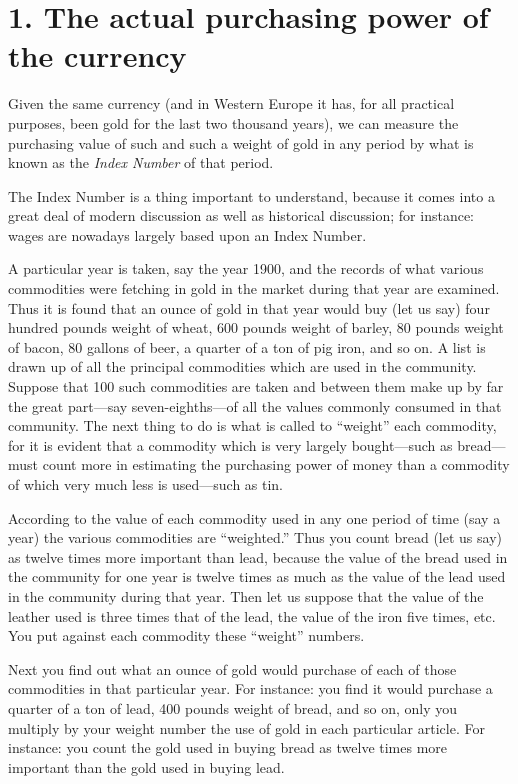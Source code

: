 \documentclass{book}
\begin{document}
\section*{1. The actual purchasing power of the currency}
Given the same currency (and in Western Europe it has, for all practical purposes, been gold for the last two thousand years), we can measure the purchasing value of such and such a weight of gold in any period by what is known as the \emph{Index Number} of that period.

The Index Number is a thing important to understand, because it comes into a great deal of modern discussion as well as historical discussion; for instance: wages are nowadays largely based upon an Index Number.

A particular year is taken, say the year 1900, and the records of what various commodities were fetching in gold in the market during that year are examined. Thus it is found that an ounce of gold in that year would buy (let us say) four hundred pounds weight of wheat, 600 pounds weight of barley, 80 pounds weight of bacon, 80 gallons of beer, a quarter of a ton of pig iron, and so on. A list is drawn up of all the principal commodities which are used in the community. Suppose that 100 such commodities are taken and between them make up by far the great part—say seven-eighths—of all the values commonly consumed in that community. The next thing to do is what is called to “weight” each commodity, for it is evident that a commodity which is very largely bought—such as bread—must count more in estimating the purchasing power of money than a commodity of which very much less is used—such as tin.

According to the value of each commodity used in any one period of time (say a year) the various commodities are “weighted.” Thus you count bread (let us say) as twelve times more important than lead, because the value of the bread used in the community for one year is twelve times as much as the value of the lead used in the community during that year. Then let us suppose that the value of the leather used is three times that of the lead, the value of the iron five times, etc. You put against each commodity these “weight” numbers.

Next you find out what an ounce of gold would purchase of each of those commodities in that particular year. For instance: you find it would purchase a quarter of a ton of lead, 400 pounds weight of bread, and so on, only you multiply by your weight number the use of gold in each particular article. For instance: you count the gold used in buying bread as twelve times more important than the gold used in buying lead.
\end{document}
